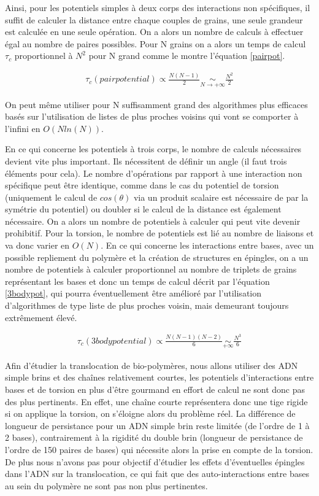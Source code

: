 Ainsi, pour les potentiels simples à deux corps des interactions non spécifiques, il suffit de calculer la distance entre chaque couples de grains, une seule grandeur est calculée en une seule opération. On a alors un nombre de calculs à effectuer égal au nombre de paires possibles. Pour N grains on a alors un temps de calcul $\tau_c$ proportionnel à $N^2$ pour N grand comme le montre l'équation \ref{pairpot}.

\begin{eqnarray}
\tau_c(pairpotential) \propto \frac{N(N-1)}{2} \underset{N \rightarrow +\infty}{\sim} \frac{N^2}{2}
\label{pairpot}
\end{eqnarray}

On peut même utiliser pour N suffisamment grand des algorithmes plus efficaces basés sur l'utilisation de listes de plus proches voisins \cite{Vaidya1989} qui vont se comporter à l'infini en $O(Nln(N))$.

En ce qui concerne les potentiels à trois corps, le nombre de calculs nécessaires devient vite plus important. Ils nécessitent de définir un angle (il faut trois éléments pour cela). Le nombre d'opérations par rapport à une interaction non spécifique peut être identique, comme dans le cas du potentiel de torsion (uniquement le calcul de $cos(\theta)$ via un produit scalaire est nécessaire de par la symétrie du potentiel) ou doubler si le calcul de la distance est également nécessaire. On a alors un nombre de potentiels à calculer qui peut vite devenir prohibitif. Pour la torsion, le nombre de potentiels est lié au nombre de liaisons et va donc varier en $O(N)$. En ce qui concerne les interactions entre bases, avec un possible repliement du polymère et la création de structures en épingles, on a un nombre de potentiels à calculer proportionnel au nombre de triplets de grains représentant les bases et donc un temps de calcul décrit par l'équation \ref{3bodypot}, qui pourra éventuellement être amélioré par l'utilisation d'algorithmes de type liste de plus proches voisin, mais demeurant toujours extrêmement élevé.

\begin{eqnarray}
\tau_c(3bodypotential) \propto \frac{N(N-1)(N-2)}{6} \underset{+\infty}{\sim} \frac{N^3}{6}
\label{3bodypot}
\end{eqnarray}



Afin d'étudier la translocation de bio-polymères, nous allons utiliser des ADN simple brins et des chaînes relativement courtes, les potentiels d'interactions entre bases et de torsion en plus d'être gourmand en effort de calcul ne sont donc pas des plus pertinents. En effet, une chaîne courte représentera donc une tige rigide si on applique la torsion, on s'éloigne alors du problème réel. La différence de longueur de persistance pour un ADN simple brin reste limitée (de l'ordre de 1 à 2 bases), contrairement à la rigidité du double brin (longueur de persistance de l'ordre de 150 paires de bases) qui nécessite alors la prise en compte de la torsion. De plus nous n'avons pas pour objectif d'étudier les effets d'éventuelles épingles dans l'ADN sur la translocation, ce qui fait que des auto-interactions entre bases au sein du polymère ne sont pas non plus pertinentes.

